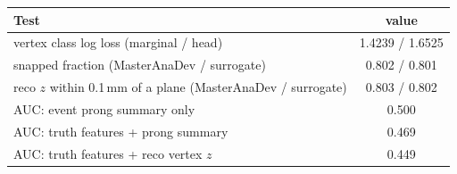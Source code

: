 \begin{tabular}{lc}
\toprule
Test & value \\
\midrule
vertex class log loss (marginal / head) & 1.4239 / 1.6525 \\
snapped fraction (MasterAnaDev / surrogate) & 0.802 / 0.801 \\
reco $z$ within 0.1\,mm of a plane (MasterAnaDev / surrogate) & 0.803 / 0.802 \\
\midrule
AUC: event prong summary only & 0.500 \\
AUC: truth features + prong summary & 0.469 \\
AUC: truth features + reco vertex $z$ & 0.449 \\
\bottomrule
\end{tabular}
